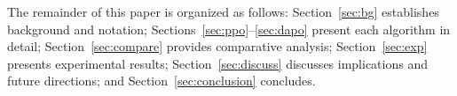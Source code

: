 The remainder of this paper is organized as follows: Section~\ref{sec:bg} establishes background and notation; Sections~\ref{sec:ppo}--\ref{sec:dapo} present each algorithm in detail; Section~\ref{sec:compare} provides comparative analysis; Section~\ref{sec:exp} presents experimental results; Section~\ref{sec:discuss} discusses implications and future directions; and Section~\ref{sec:conclusion} concludes.
